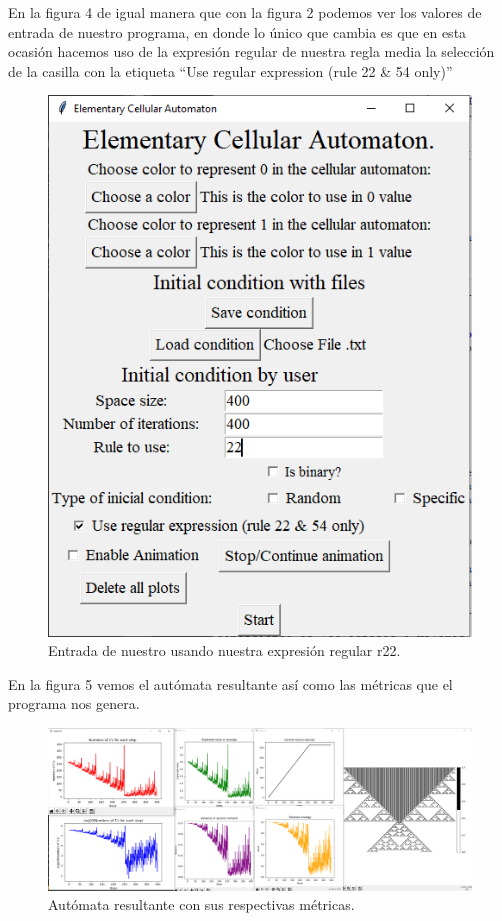 \documentclass[11pt]{article}
\begin{document}
		En la figura 4 de igual manera que con la figura 2 podemos ver los valores de entrada de nuestro programa, en donde lo único que cambia es que en esta ocasión hacemos uso de la expresión regular de nuestra regla media la selección de la casilla con la etiqueta ``Use regular expression (rule 22 \& 54 only)''
		\begin{figure}[H]
			\centering
			\includegraphics[scale=0.5]{resources/RegEx22/50_prob_regex_entrada.png}
			\caption{Entrada de nuestro usando nuestra expresión regular r22.}\label{fig:picture}
		\end{figure}
		En la figura 5 vemos el autómata resultante así como las métricas que el programa nos genera.
		\begin{figure}[H]
			\includegraphics[scale=0.26]{resources/RegEx22/50_prob_regex_result.png}
			\caption{Autómata resultante con sus respectivas métricas.}\label{fig:picture}
		\end{figure}
\end{document}
